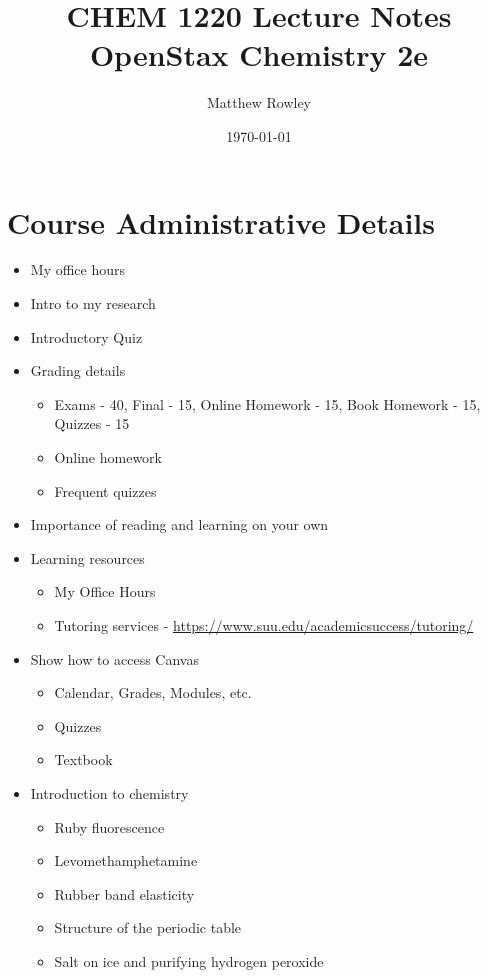 \documentclass[12pt, openany, letterpaper]{memoir}
\begin{document}
\title{CHEM 1220 Lecture Notes\\ OpenStax Chemistry 2e}
\author{Matthew Rowley}
\date{\today}
\mainmatter
\maketitle
\chapter*{Course Administrative Details}
\begin{itemize}
	\item My office hours
	\item Intro to my research
	\item Introductory Quiz
	\item Grading details
	      \begin{itemize}
		      \item Exams - 40, Final - 15, Online Homework - 15, Book Homework - 15, Quizzes - 15
		      \item Online homework
		      \item Frequent quizzes
	      \end{itemize}
	\item Importance of reading and learning on your own
	\item Learning resources
	      \begin{itemize}
		      \item My Office Hours
		      \item Tutoring services - \href{https://www.suu.edu/academicsuccess/tutoring/}{https://www.suu.edu/academicsuccess/tutoring/}
	      \end{itemize}
	\item Show how to access Canvas
	      \begin{itemize}
		      \item Calendar, Grades, Modules, etc.
		      \item Quizzes
		      \item Textbook
	      \end{itemize}
	\item Introduction to chemistry
	      \begin{itemize}
		      \item Ruby fluorescence
		      \item Levomethamphetamine
		      \item Rubber band elasticity
		      \item Structure of the periodic table
		      \item Salt on ice and purifying hydrogen peroxide
	      \end{itemize}
\end{itemize}
\end{document}
